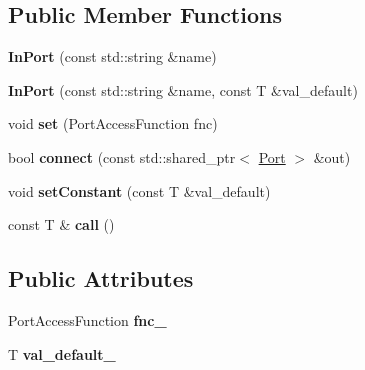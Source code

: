 \subsection*{Public Member Functions}
\begin{DoxyCompactItemize}
\item 
{\bfseries In\+Port} (const std\+::string \&name)\hypertarget{classow_1_1InPort_a00e1f944e7b9294e24d7c5cdcecdaffa}{}\label{classow_1_1InPort_a00e1f944e7b9294e24d7c5cdcecdaffa}

\item 
{\bfseries In\+Port} (const std\+::string \&name, const T \&val\+\_\+default)\hypertarget{classow_1_1InPort_a28d6bc84a1cc5a9b5abb6e1ee6a0e349}{}\label{classow_1_1InPort_a28d6bc84a1cc5a9b5abb6e1ee6a0e349}

\item 
void {\bfseries set} (Port\+Access\+Function fnc)\hypertarget{classow_1_1InPort_aeac49855fbada033e1ea797d26b01197}{}\label{classow_1_1InPort_aeac49855fbada033e1ea797d26b01197}

\item 
bool {\bfseries connect} (const std\+::shared\+\_\+ptr$<$ \hyperlink{classow_1_1Port}{Port} $>$ \&out)\hypertarget{classow_1_1InPort_ae1c20bbe98560341378ecd872c9cf2b8}{}\label{classow_1_1InPort_ae1c20bbe98560341378ecd872c9cf2b8}

\item 
void {\bfseries set\+Constant} (const T \&val\+\_\+default)\hypertarget{classow_1_1InPort_a36299dbf9396d726d36a4b3040a278a7}{}\label{classow_1_1InPort_a36299dbf9396d726d36a4b3040a278a7}

\item 
const T \& {\bfseries call} ()\hypertarget{classow_1_1InPort_af0c107748c1db3d3d8643a848aa54ea3}{}\label{classow_1_1InPort_af0c107748c1db3d3d8643a848aa54ea3}

\end{DoxyCompactItemize}
\subsection*{Public Attributes}
\begin{DoxyCompactItemize}
\item 
Port\+Access\+Function {\bfseries fnc\+\_\+}\hypertarget{classow_1_1InPort_ac59ff602a357d1274eff301d5d83f7a8}{}\label{classow_1_1InPort_ac59ff602a357d1274eff301d5d83f7a8}

\item 
T {\bfseries val\+\_\+default\+\_\+}\hypertarget{classow_1_1InPort_ad79ab3ce1048376fc8958728ea1d2f83}{}\label{classow_1_1InPort_ad79ab3ce1048376fc8958728ea1d2f83}

\end{DoxyCompactItemize}
